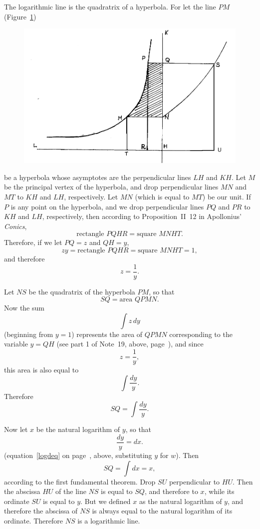 \documentclass[polutonikogreek,english,twoside,openright]{article}
\begin{document}
\setcounter{equation}{0}

\label{begloghyp} 

The logarithmic line is the quadratrix of a hyperbola.  For let the line $PM$ (Figure~\ref{hypquad})
\begin{figure}[htp]
\begin{center}
\includegraphics[width=\textwidth]{fig/Figure52}
\caption{}
\label{hypquad}
\vspace{-10pt}
\end{center}
\end{figure} 
 be a hyperbola whose asymptotes are the perpendicular lines $LH$ and $KH$.  Let $M$ be the principal vertex of the hyperbola, and drop perpendicular lines $MN$ and $MT$ to $KH$ and $LH$, respectively.  Let $MN$ (which is equal to $MT$) be our unit.  If $P$ is any point on the hyperbola, and we drop perpendicular lines $PQ$ and $PR$ to $KH$ and $LH$, respectively,  then according to Proposition~II~12 in Apollonius' {\em Conics}, 
$$\mbox{rectangle }PQHR = \mbox{square }MNHT.$$
Therefore, if we let $PQ=z$ and $QH=y$, 
$$zy = \mbox{rectangle }PQHR = \mbox{square }MNHT = 1,$$
and therefore
$$z = \frac{1}{y}.$$


Let $NS$ be the quadratrix of the hyperbola $PM$, so that 
$$SQ = \mbox{area }QPMN.$$
Now the sum
$$\int\! z\,dy$$
(beginning from $y=1$) represents the area of $QPMN$ corresponding to the variable $y = QH$  (see part 1 of Note~19, above, page~\pageref{meas}), and since 
$$z = \frac{1}{y},$$
this area is also equal to
$$\int\! \frac{dy}{y}.$$
Therefore 
$$SQ = \int\! \frac{dy}{y}.$$


Now let $x$ be the natural logarithm of $y$, so that 
$$\frac{dy}{y} = dx.$$
(equation~\ref{logdeq} on page~\pageref{logdeq}, above, substituting $y$ for $w$). Then
$$SQ= \int\! dx = x,$$
according to the first fundamental theorem.  Drop $SU$ perpendicular
to $HU$.  Then the abscissa $HU$ of the line $NS$ is equal to $SQ$,
and therefore to $x$, while its ordinate $SU$ is equal to $y$.  But we
defined $x$ as the natural logarithm of $y$, and therefore the
abscissa of $NS$ is always equal to the natural logarithm of its
ordinate.  Therefore $NS$ is a logarithmic line.
\label{endloghyp}
  
\end{document}
